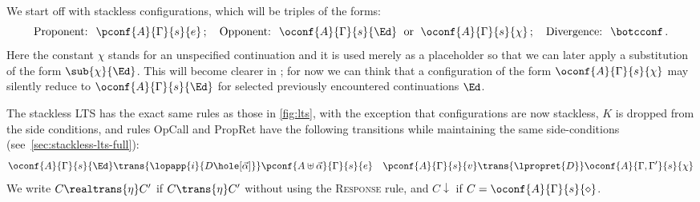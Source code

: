 
We start off with stackless configurations, which  will  be triples of the forms:
\[
\text{Proponent: }\;  \pconf{A}{\Gamma}{s}{e}\,;\quad\text{Opponent: }\;
\oconf{A}{\Gamma}{s}{\Ed}\;\text{ or }\;\oconf{A}{\Gamma}{s}{\chi}\,;\quad
\text{Divergence: }\; \botcconf\,.
\]
Here the constant $\chi$
stands for an unspecified continuation and it is used merely as a placeholder so that we can later apply a substitution of the form $\sub{\chi}{\Ed}$. This will become clearer in ; for now we can think that a configuration of the form $\oconf{A}{\Gamma}{s}{\chi}$ may silently reduce to $\oconf{A}{\Gamma}{s}{\Ed}$ for selected previously encountered continuations $\Ed$.

\begin{definition}\label{def:SLlts}
  The stackless LTS has the exact same rules as those in \cref{fig:lts}, with the exception that configurations are now stackless, $K$ is dropped from the side conditions, and rules {\sc OpCall} and {\sc PropRet} have the following transitions while maintaining the same side-conditions (see~\cref{sec:stackless-lts-full}):
  \begin{align*}
     \oconf{A}{\Gamma}{s}{\Ed}
      \trans{\lopapp{i}{D\hole[\vec \alpha]}}
      \pconf{A\uplus\vec\alpha}{\Gamma}{s}{e}
      &&
      \pconf{A}{\Gamma}{s}{v}
      \trans{\lpropret{D}}
      \oconf{A}{\Gamma,\Gamma'}{s}{\chi}
  \end{align*}
  {We write $C{\realtrans{\eta}}C'$ if $C{\trans{\eta}}C'$ without using the \textsc{Response} rule,
  and $C{\downarrow}$ if $C=\oconf{A}{\Gamma}{s}{\diamond}$.}
\end{definition}


